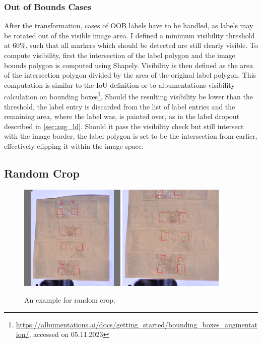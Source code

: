 \documentclass[10pt]{book}
\begin{document}
\subsubsection{Out of Bounds Cases}
\label{sec:oob}

After the transformation, cases of \ac{OOB} labels have to be handled, as labels may be rotated out of the visible image area. I defined a minimum visibility threshold at 60\%, such that all markers which should be detected are still clearly visible. To compute visibility, first the intersection of the label polygon and the image bounds polygon is computed using Shapely. Visibility is then defined as the area of the intersection polygon divided by the area of the original label polygon. This computation is similar to the \ac{IoU} definition or to albumentations visibility calculation on bounding boxes\footnote{\url{https://albumentations.ai/docs/getting_started/bounding_boxes_augmentation/}, accessed on 05.11.2023}. Should the resulting visibility be lower than the threshold, the label entry is discarded from the list of label entries and the remaining area, where the label was, is painted over, as in the label dropout described in \autoref{sec:aug_ld}. Should it pass the visibility check but still intersect with the image border, the label polygon is set to be the intersection from earlier, effectively clipping it within the image space.

\subsection{Random Crop}

\begin{figure}
  \centering
     {\includegraphics[width=0.45\textwidth]{image/aug_rc_before}}
     {\includegraphics[width=0.45\textwidth]{image/aug_rc_after}}
  \caption{An example for random crop.}
  \label{fig:aug_rc_example}
\end{figure}
\end{document}
